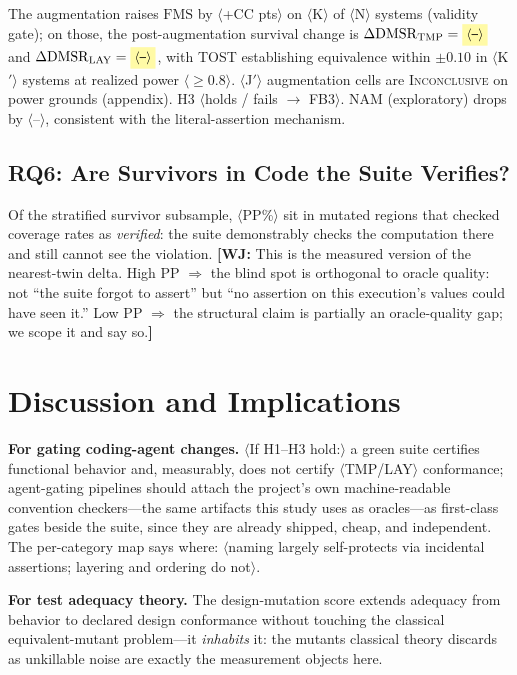 \documentclass[conference]{IEEEtran}
\newcommand{\ph}[1]{\colorbox{yellow!35}{\small$\langle$\textsf{#1}$\rangle$}}
\newcommand{\wj}[1]{{\color{blue}\footnotesize\textbf{[WJ:} #1\textbf{]}}}
\newcommand{\dmsr}{\mathrm{DMSR}}
\newcommand{\fms}{\mathrm{FMS}}
\begin{document}
The augmentation raises $\fms$ by \ph{+CC pts} on \ph{K} of \ph{N} systems (validity gate); on those, the post-augmentation survival change is $\Delta\dmsr_{\mathrm{TMP}} = \ph{--}$ and $\Delta\dmsr_{\mathrm{LAY}} = \ph{--}$, with TOST establishing equivalence within $\pm0.10$ in \ph{K$'$} systems at realized power \ph{$\geq$0.8}. \ph{J$'$} augmentation cells are \textsc{Inconclusive} on power grounds (appendix). H3 \ph{holds / fails $\to$ FB3}. NAM (exploratory) drops by \ph{--}, consistent with the literal-assertion mechanism.

\subsection{RQ6: Are Survivors in Code the Suite Verifies?}\label{sec:results-cc}

Of the stratified survivor subsample, \ph{PP\%} sit in mutated regions that checked coverage rates as \emph{verified}: the suite demonstrably checks the computation there and still cannot see the violation. \wj{This is the measured version of the nearest-twin delta. High PP $\Rightarrow$ the blind spot is orthogonal to oracle quality: not ``the suite forgot to assert'' but ``no assertion on this execution's values could have seen it.'' Low PP $\Rightarrow$ the structural claim is partially an oracle-quality gap; we scope it and say so.}

\section{Discussion and Implications}\label{sec:discussion}

\textbf{For gating coding-agent changes.} \ph{If H1--H3 hold:} a green suite certifies functional behavior and, measurably, does not certify \ph{TMP/LAY} conformance; agent-gating pipelines should attach the project's own machine-readable convention checkers---the same artifacts this study uses as oracles---as first-class gates beside the suite, since they are already shipped, cheap, and independent. The per-category map says where: \ph{naming largely self-protects via incidental assertions; layering and ordering do not}.

\textbf{For test adequacy theory.} The design-mutation score extends adequacy from behavior to declared design conformance without touching the classical equivalent-mutant problem---it \emph{inhabits} it: the mutants classical theory discards as unkillable noise are exactly the measurement objects here.
\end{document}
